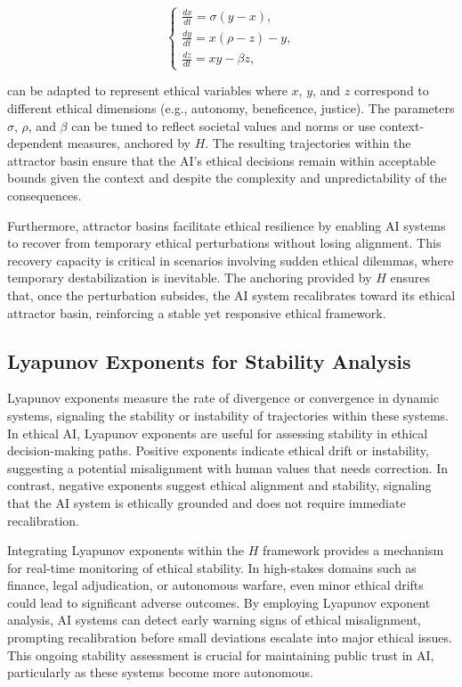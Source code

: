 \documentclass[12pt]{article}
\begin{document}
\[
\begin{cases}
\frac{dx}{dt} = \sigma(y - x), \\
\frac{dy}{dt} = x(\rho - z) - y, \\
\frac{dz}{dt} = xy - \beta z,
\end{cases}
\]

can be adapted to represent ethical variables where \(x\), \(y\), and \(z\) correspond to different ethical dimensions (e.g., autonomy, beneficence, justice). The parameters \(\sigma\), \(\rho\), and \(\beta\) can be tuned to reflect societal values and norms or use context-dependent measures, anchored by \(H\). The resulting trajectories within the attractor basin ensure that the AI's ethical decisions remain within acceptable bounds given the context and despite the complexity and unpredictability of the consequences.

Furthermore, attractor basins facilitate ethical resilience by enabling AI systems to recover from temporary ethical perturbations without losing alignment. This recovery capacity is critical in scenarios involving sudden ethical dilemmas, where temporary destabilization is inevitable. The anchoring provided by \(H\) ensures that, once the perturbation subsides, the AI system recalibrates toward its ethical attractor basin, reinforcing a stable yet responsive ethical framework.

\subsection{Lyapunov Exponents for Stability Analysis}
Lyapunov exponents measure the rate of divergence or convergence in dynamic systems, signaling the stability or instability of trajectories within these systems. In ethical AI, Lyapunov exponents are useful for assessing stability in ethical decision-making paths. Positive exponents indicate ethical drift or instability, suggesting a potential misalignment with human values that needs correction. In contrast, negative exponents suggest ethical alignment and stability, signaling that the AI system is ethically grounded and does not require immediate recalibration.

Integrating Lyapunov exponents within the \(H\) framework provides a mechanism for real-time monitoring of ethical stability. In high-stakes domains such as finance, legal adjudication, or autonomous warfare, even minor ethical drifts could lead to significant adverse outcomes. By employing Lyapunov exponent analysis, AI systems can detect early warning signs of ethical misalignment, prompting recalibration before small deviations escalate into major ethical issues. This ongoing stability assessment is crucial for maintaining public trust in AI, particularly as these systems become more autonomous.
\end{document}
